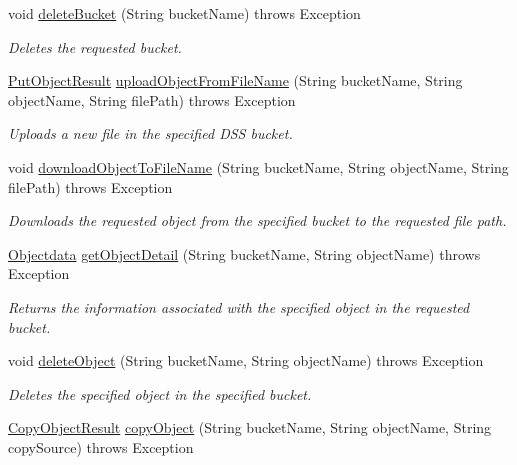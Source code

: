 \begin{DoxyCompactItemize}
void \hyperlink{classorg_1_1jcs_1_1dss_1_1main_1_1DssConnection_a081d22d9eb0696a963995e1d44b25812}{delete\+Bucket} (String bucket\+Name)  throws Exception 
\begin{DoxyCompactList}\small\item\em Deletes the requested bucket. \end{DoxyCompactList}\item 
\hyperlink{classorg_1_1jcs_1_1dss_1_1main_1_1PutObjectResult}{Put\+Object\+Result} \hyperlink{classorg_1_1jcs_1_1dss_1_1main_1_1DssConnection_aa8b4864c3503f500b53d5da22d44f66f}{upload\+Object\+From\+File\+Name} (String bucket\+Name, String object\+Name, String file\+Path)  throws Exception 
\begin{DoxyCompactList}\small\item\em Uploads a new file in the specified D\+SS bucket. \end{DoxyCompactList}\item 
void \hyperlink{classorg_1_1jcs_1_1dss_1_1main_1_1DssConnection_a36c8cb22551c789ff504cad62a63e034}{download\+Object\+To\+File\+Name} (String bucket\+Name, String object\+Name, String file\+Path)  throws Exception 
\begin{DoxyCompactList}\small\item\em Downloads the requested object from the specified bucket to the requested file path. \end{DoxyCompactList}\item 
\hyperlink{classorg_1_1jcs_1_1dss_1_1main_1_1Objectdata}{Objectdata} \hyperlink{classorg_1_1jcs_1_1dss_1_1main_1_1DssConnection_a0d820a1c0824ade9d5a62f3593df73eb}{get\+Object\+Detail} (String bucket\+Name, String object\+Name)  throws Exception 
\begin{DoxyCompactList}\small\item\em Returns the information associated with the specified object in the requested bucket. \end{DoxyCompactList}\item 
void \hyperlink{classorg_1_1jcs_1_1dss_1_1main_1_1DssConnection_ac7f5809280a368cf5f990f18d91a744c}{delete\+Object} (String bucket\+Name, String object\+Name)  throws Exception 
\begin{DoxyCompactList}\small\item\em Deletes the specified object in the specified bucket. \end{DoxyCompactList}\item 
\hyperlink{classorg_1_1jcs_1_1dss_1_1main_1_1CopyObjectResult}{Copy\+Object\+Result} \hyperlink{classorg_1_1jcs_1_1dss_1_1main_1_1DssConnection_a31daa51ffca93a02083410c0e4502625}{copy\+Object} (String bucket\+Name, String object\+Name, String copy\+Source)  throws Exception

\end{DoxyCompactItemize}
